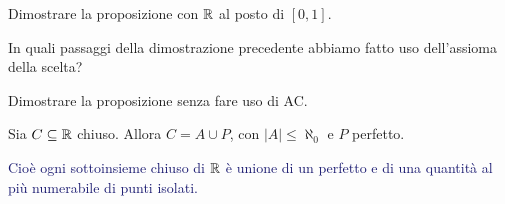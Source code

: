\begin{exercise}
	Dimostrare la proposizione con $\mathbb R$ al posto di $[0,1]$.
\end{exercise}

\begin{exercise}
	In quali passaggi della dimostrazione precedente abbiamo fatto uso dell'assioma della scelta?
\end{exercise}

\begin{exercise}
	Dimostrare la proposizione senza fare uso di AC.
\end{exercise}

\begin{theorem}
	\label{Cantor_Bendixson}
	Sia $C \subseteq \mathbb R$ chiuso. Allora $C = A \cup P$, con $|A| \leq \aleph_0$ e $P$ perfetto.
\end{theorem}

\textcolor{MidnightBlue}{Cioè ogni sottoinsieme chiuso di $\mathbb R$ è unione di un perfetto e di una quantità al più numerabile di punti isolati.}


